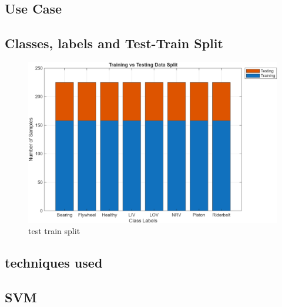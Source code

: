 \documentclass[12pt,a4paper]{article}
\begin{document}
\begin{multicols}{2}
\section{Use Case}
\subsection{Classes, labels and Test-Train Split}
\begin{figure}[H]
    \centering
    \includegraphics[width=1\linewidth]{Diagrams/split.png}
    \caption{test train split}
    \label{fig:split}
\end{figure}
\subsection{techniques used}
\subsection{SVM}
\label{sec:classification}

\end{multicols}
\end{document}
